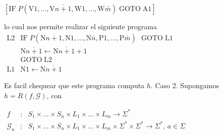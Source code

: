 \(\displaystyle \left[ \mathrm{IF}\;P(\mathrm{V}1,...,\mathrm{V}\overline{n+1},\mathrm{W} 1,...,\mathrm{W}\bar{m})\;\mathrm{GOTO}\;\mathrm{A}1\right] \)

lo cual nos permite realizar el siguiente programa
\(\displaystyle \begin{array}{ll} \mathrm{L}2 & \mathrm{IF}\;P(\mathrm{N}\overline{n+1},\mathrm{N}1,..., \mathrm{N}\bar{n},\mathrm{P}1,...,\mathrm{P}\bar{m})\text{\ }\mathrm{GOTO}\; \mathrm{L}1 \\ & \mathrm{N}\overline{n+1}\leftarrow \mathrm{N}\overline{n+1}+1 \\ & \mathrm{GOTO}\;\mathrm{L}2 \\ \mathrm{L}1 & \mathrm{N}1\leftarrow \mathrm{N}\overline{n+1} \end{array} \)

Es facil chequear que este programa computa \(h.\)
Caso 2. Supongamos \(h=R(f,\mathcal{G})\), con

\(\displaystyle \begin{array}{rcl} f & :& S_{1}\times ...\times S_{n}\times L_{1}\times ...\times L_{m}\rightarrow \Sigma ^{\ast } \\ \mathcal{G}_{a} & :& S_{1}\times ...\times S_{n}\times L_{1}\times ...\times L_{m}\times \Sigma ^{\ast }\times \Sigma ^{\ast }\rightarrow \Sigma ^{\ast } \text{, }a\in \Sigma \end{array} \)

